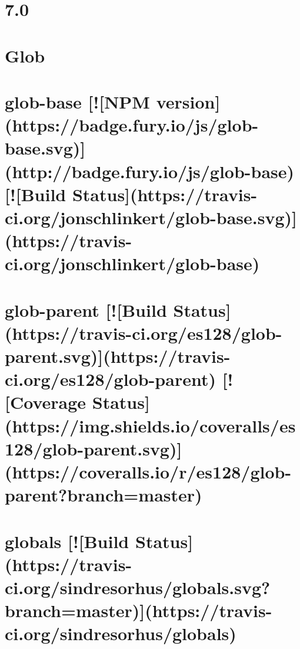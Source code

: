 \documentclass[twoside]{book}
\newcommand{\+}{\discretionary{\mbox{\scriptsize$\hookleftarrow$}}{}{}}
\begin{document}
\chapter{7.0}
\label{md__c_1_workspace_demo_src_main_script_node_modules_glob_changelog}

\chapter{Glob}
\label{md__c_1_workspace_demo_src_main_script_node_modules_glob__r_e_a_d_m_e}

\chapter{glob-\/base \mbox{[}!\mbox{[}N\+PM version\mbox{]}(https\+://badge.fury.\+io/js/glob-\/base.svg)\mbox{]}(http\+://badge.fury.\+io/js/glob-\/base) \mbox{[}!\mbox{[}Build Status\mbox{]}(https\+://travis-\/ci.org/jonschlinkert/glob-\/base.svg)\mbox{]}(https\+://travis-\/ci.org/jonschlinkert/glob-\/base)}
\label{md__c_1_workspace_demo_src_main_script_node_modules_glob-base__r_e_a_d_m_e}

\chapter{glob-\/parent \mbox{[}!\mbox{[}Build Status\mbox{]}(https\+://travis-\/ci.org/es128/glob-\/parent.svg)\mbox{]}(https\+://travis-\/ci.org/es128/glob-\/parent) \mbox{[}!\mbox{[}Coverage Status\mbox{]}(https\+://img.shields.\+io/coveralls/es128/glob-\/parent.svg)\mbox{]}(https\+://coveralls.io/r/es128/glob-\/parent?branch=master)}
\label{md__c_1_workspace_demo_src_main_script_node_modules_glob-parent__r_e_a_d_m_e}

\chapter{globals \mbox{[}!\mbox{[}Build Status\mbox{]}(https\+://travis-\/ci.org/sindresorhus/globals.svg?branch=master)\mbox{]}(https\+://travis-\/ci.org/sindresorhus/globals)}
\label{md__c_1_workspace_demo_src_main_script_node_modules_globals_readme}

\end{document}
